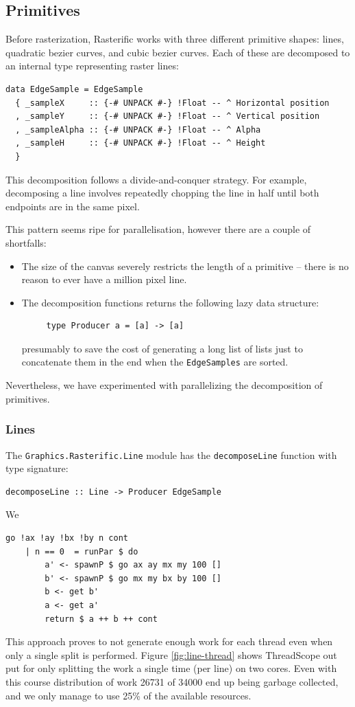 \documentclass[12pt, a4paper]{article}
\begin{document}
\subsection{Primitives}
Before rasterization, Rasterific works with three different primitive shapes:
lines, quadratic bezier curves, and cubic bezier curves. Each of these are decomposed
to an internal type representing raster lines:
\begin{lstlisting}[caption={\texttt{EdgeSample} type -- represents a raster line.}]
data EdgeSample = EdgeSample
  { _sampleX     :: {-# UNPACK #-} !Float -- ^ Horizontal position
  , _sampleY     :: {-# UNPACK #-} !Float -- ^ Vertical position
  , _sampleAlpha :: {-# UNPACK #-} !Float -- ^ Alpha
  , _sampleH     :: {-# UNPACK #-} !Float -- ^ Height
  }
\end{lstlisting}
This decomposition follows a divide-and-conquer strategy. For example, decomposing a line
involves repeatedly chopping the line in half until both endpoints are in the same pixel.

This pattern seems ripe for parallelisation, however there are a couple of shortfalls:
\begin{itemize}
\item The size of the canvas severely restricts the length of a primitive -- there is no reason to ever
   have a million pixel line.
 \item The decomposition functions returns the following lazy data structure:
   \begin{lstlisting}
     type Producer a = [a] -> [a]\end{lstlisting}
   presumably to save the cost of generating a long list of lists just to concatenate them in the end
    when the \texttt{EdgeSamples} are sorted.
  \end{itemize}
  Nevertheless, we have experimented with parallelizing the decomposition of primitives.

\subsubsection{Lines}
The \texttt{Graphics.Rasterific.Line} module has the \texttt{decomposeLine} function with type
signature:
\begin{lstlisting}
decomposeLine :: Line -> Producer EdgeSample\end{lstlisting}
We %
\begin{lstlisting}[caption={Naively splitting work in two parts}]
    go !ax !ay !bx !by n cont
    | n == 0  = runPar $ do
        a' <- spawnP $ go ax ay mx my 100 []
        b' <- spawnP $ go mx my bx by 100 []
        b <- get b'
        a <- get a'
        return $ a ++ b ++ cont
\end{lstlisting}
This approach proves to not generate enough work for each thread even when only a single split
is performed. Figure \ref{fig:line-thread} shows ThreadScope out put for only splitting the
work a single time (per line) on two cores. Even with this course distribution of work
26731 of 34000 end up being garbage collected, and we only manage to use 25\% of the available
resources.
\end{document}
